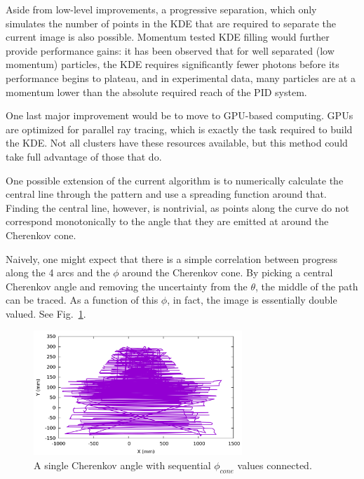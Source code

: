 Aside from low-level improvements, a progressive separation, which only simulates the number of points in the KDE that are required to separate the current image is also possible.  Momentum tested KDE filling would further provide performance gains: it has been observed that for well separated (low momentum) particles, the KDE requires significantly fewer photons before its performance begins to plateau, and in experimental data, many particles are at a momentum lower than the absolute required reach of the PID system.

One last major improvement would be to move to GPU-based computing.  GPUs are optimized for parallel ray tracing, which is exactly the task required to build the KDE.  Not all clusters have these resources available, but this method could take full advantage of those that do.


One possible extension of the current algorithm is to numerically calculate the central line through the pattern and use a spreading function around that.  Finding the central line, however, is nontrivial, as points along the curve do not correspond monotonically to the angle that they are emitted at around the Cherenkov cone.

Naively, one might expect that there is a simple correlation between progress along the 4 arcs and the $\phi$ around the Cherenkov cone.  By picking a central Cherenkov angle and removing the uncertainty from the $\theta$, the middle of the path can be traced.  As a function of this $\phi$, in fact, the image is essentially double valued.  See Fig.~\ref{fig:double_dirc_image}.

\begin{figure}[!h]
\centering
\includegraphics[width=0.7\textwidth]{pics/DoubleVals.pdf}
\caption{A single Cherenkov angle with sequential $\phi_{cone}$ values connected.}
\label{fig:double_dirc_image}
\end{figure}

